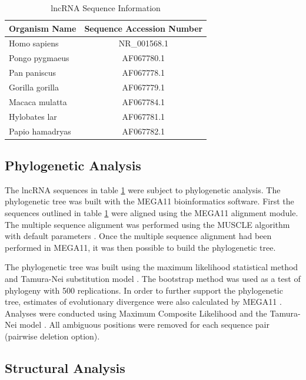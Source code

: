\documentclass[conference, 11pt]{IEEEtran}
\begin{document}
\begin{table}[ht]
  \centering
  \caption{lncRNA Sequence Information}
  \label{tbl:accession}
  \begin{tabular}{lc}
    \toprule
    Organism Name & Sequence Accession Number \\
    \midrule
    Homo sapiens    & NR\_001568.1 \\
    Pongo pygmaeus  & AF067780.1 \\
    Pan paniscus    & AF067778.1 \\
    Gorilla gorilla & AF067779.1 \\
    Macaca mulatta  & AF067784.1 \\
    Hylobates lar   & AF067781.1 \\
    Papio hamadryas & AF067782.1 \\
    \bottomrule
  \end{tabular}
\end{table}

\subsection{Phylogenetic Analysis}\label{sec:phylo}

The lncRNA sequences in table \ref{tbl:accession} were subject to phylogenetic analysis.
The phylogenetic tree was built with the MEGA11 \cite{tamura2021mega11} bioinformatics software. 
First the sequences outlined in table \ref{tbl:accession} were aligned using the MEGA11 alignment module. 
The multiple sequence alignment was performed using the MUSCLE algorithm with default parameters \cite{edgar2004muscle}. 
Once the multiple sequence alignment had been performed in MEGA11, it was then possible to build the phylogenetic tree. 

The phylogenetic tree was built using the maximum likelihood statistical method and Tamura-Nei substitution model \cite{tamura1993estimation, tamura2004prospects}. 
The bootstrap method was used as a test of phylogeny with 500 replications.
In order to further support the phylogenetic tree, estimates of evolutionary divergence were also calculated by MEGA11 \cite{tamura2021mega11}. 
Analyses were conducted using Maximum Composite Likelihood and the Tamura-Nei model \cite{tamura1993estimation, tamura2004prospects}. 
All ambiguous positions were removed for each sequence pair (pairwise deletion option). 

\subsection{Structural Analysis}\label{sec:structure}
\end{document}
